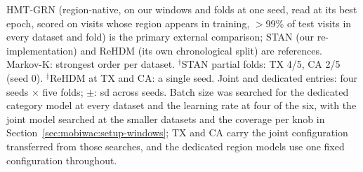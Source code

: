 \begin{table}[htbp]
\vspace{2pt}
{\footnotesize HMT-GRN (region-native, on our windows and folds at one seed, read at its best epoch, scored on visits whose region appears in training, $>$99\% of test visits in every dataset
and fold) is the primary external comparison; STAN (our re-implementation) and ReHDM (its own chronological split)
are references. Markov-K: strongest order per dataset. $^{\dagger}$STAN partial folds: TX 4/5, CA 2/5
(seed 0). $^{\ddagger}$ReHDM at TX and CA: a single seed. Joint and dedicated entries: four seeds
$\times$ five folds; $\pm$: sd across seeds. Batch size was searched for the dedicated
category model at every dataset and the learning rate at four of the six, with the joint model
searched at the smaller datasets and the coverage per knob in
Section~\ref{sec:mobiwac:setup-windows}; TX and CA
carry the joint configuration transferred from those searches, and the dedicated region models use one
fixed configuration throughout.}
\end{table}
